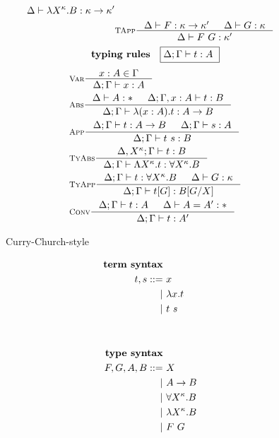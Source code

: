 \begin{figure}
\begin{singlespace}
\begin{minipage}{.46\textwidth}
\begin{align*}
		      {\Delta |- \l X^\kappa.B:\kappa -> \kappa'} \\
& \inference[\sc TApp]{\Delta |- F : \kappa -> \kappa' & \Delta |- G : \kappa}
		      {\Delta |- F ~ G : \kappa'} \\
\end{align*}
\[ \textbf{typing rules} \quad \framebox{$ \Delta;\Gamma |- t : A $ } \]
\vspace*{-1em}
\begin{align*}
& \inference[\sc Var]{x:A \in \Gamma}{\Delta;\Gamma |- x:A} \\
& \inference[\sc Abs]{\Delta |- A:* & \Delta;\Gamma,x:A |- t : B}
		     {\Delta;\Gamma |- \l(x:A).t : A -> B} \\
& \inference[\sc App]{\Delta;\Gamma |- t : A -> B & \Delta;\Gamma |- s : A}
		     {\Delta;\Gamma |- t~s : B} \\
& \inference[\sc TyAbs]{\Delta,X^\kappa;\Gamma |- t : B}
		       {\Delta;\Gamma |- \L X^\kappa.t : \forall X^\kappa.B} \\
& \inference[\sc TyApp]{\Delta;\Gamma |- t : \forall X^\kappa.B & \Delta |- G:\kappa}
		       {\Delta;\Gamma |- t[G] : B[G/X]} \\
& \inference[\sc Conv]{\Delta;\Gamma |- t : A & \Delta |- A = A' : *}
		      {\Delta;\Gamma |- t : A'}
\end{align*}
\end{minipage}
\begin{minipage}{.46\textwidth}
	\begin{center}Curry-Church-style\end{center}\vspace*{-1em}
\def\baselinestretch{0}
\small
\begin{align*}
\textbf{term syntax} \\
t,s ::= &~ x           \\
      | &~ \l x    . t \\
      | &~ t ~ s       \\
      \phantom{|} &~ \\
      \phantom{|} &~ \\
\textbf{type syntax} \\
F,G,A,B ::= &~ X                  \\
          | &~ A -> B             \\
          | &~ \forall X^\kappa.B \\
          | &~ \l X^\kappa.B      \\
          | &~ F ~ G              \\

\end{align*}
\end{minipage}
\end{singlespace}
\end{figure}
